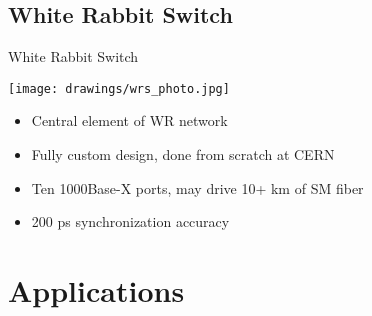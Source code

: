 \documentclass[compress,red]{beamer}
\begin{document}

\subsection {White Rabbit Switch}


\begin{frame}{White Rabbit Switch}
\begin{center}
\texttt{[image: drawings/wrs\_photo.jpg]}
\end{center}
\begin{itemize}
\item Central element of WR network
\item Fully custom design, done from scratch at CERN
\item Ten 1000Base-X ports, may drive 10+ km of SM fiber
\item 200 ps synchronization accuracy
\end{itemize}
\end{frame}



\section{Applications}
\end{document}
